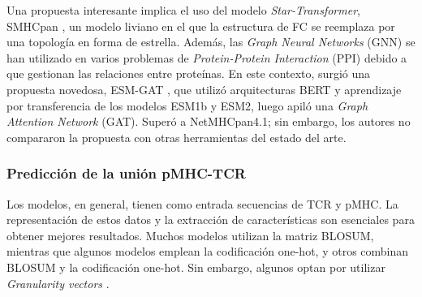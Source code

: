 Una propuesta interesante implica el uso del modelo \textit{Star-Transformer}, SMHCpan \citep{ye2023stmhcpan}, un modelo liviano en el que la estructura de FC se reemplaza por una topología en forma de estrella. Además, las \textit{Graph Neural Networks} (GNN) se han utilizado en varios problemas de \textit{Protein-Protein Interaction} (PPI) debido a que gestionan las relaciones entre proteínas. En este contexto, surgió una propuesta novedosa, ESM-GAT \citep{hashemi2023improved}, que utilizó arquitecturas BERT y aprendizaje por transferencia de los modelos ESM1b y ESM2, luego apiló una \textit{Graph Attention Network} (GAT). Superó a NetMHCpan4.1; sin embargo, los autores no compararon la propuesta con otras herramientas del estado del arte.

\subsubsection{Predicción de la unión pMHC-TCR}


Los modelos, en general, tienen como entrada secuencias de TCR y pMHC. La representación de estos datos y la extracción de características son esenciales para obtener mejores resultados. Muchos modelos utilizan la matriz BLOSUM, mientras que algunos modelos emplean la codificación one-hot, y otros combinan BLOSUM y la codificación one-hot. Sin embargo, algunos optan por utilizar \textit{Granularity vectors} \citep{xu2022attntap}. 

